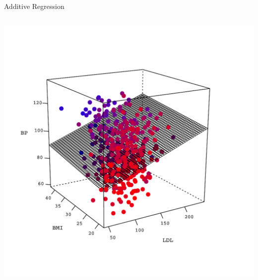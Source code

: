 \documentclass{beamer}\usepackage[]{graphicx}\usepackage[]{color}
\begin{document}
\begin{frame}{Additive Regression}
\begin{columns}
    \begin{column}{0.45\textwidth}
      \includegraphics[width = 1.1\textwidth]{figures/response_surface_plot0}
    \end{column}
  \end{columns}
  
\end{frame}

\end{document}
